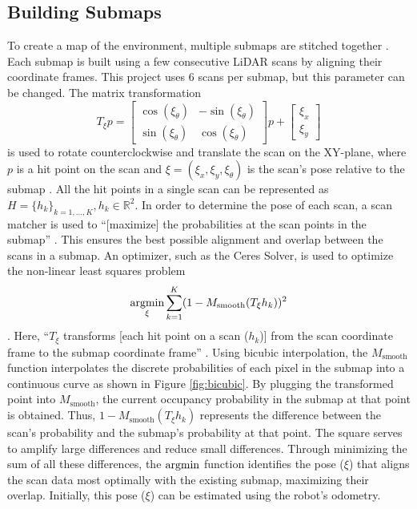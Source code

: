 \subsection{Building Submaps} \label{submaps}
To create a map of the environment, multiple submaps are stitched together \parencite{hessRealtimeLoopClosure2016}. Each submap is built using a few consecutive LiDAR scans by aligning their coordinate frames. This project uses 6 scans per submap, but this parameter can be changed. The matrix transformation
\[
    T_\xi p =
    \begin{bmatrix}
        \cos(\xi_\theta) & -\sin(\xi_\theta) \\
        \sin(\xi_\theta) & \cos(\xi_\theta)
    \end{bmatrix}p + \begin{bmatrix}
        \xi_x \\
        \xi_y
    \end{bmatrix}
\]
is used to rotate counterclockwise and translate the scan on the XY-plane, where $p$ is a hit point on the scan and $\xi=(\xi_x,\xi_y,\xi_\theta)$ is the scan's pose relative to the submap \parencite{RotationMatrix2024,hessRealtimeLoopClosure2016}. All the hit points in a single scan can be represented as $H=\{h_k\}_{k=1,\ldots,K},h_k\in\mathbb{R}^2$. In order to determine the pose of each scan, a scan matcher is used to ``[maximize] the probabilities at the scan points in the submap'' \parencite{hessRealtimeLoopClosure2016}. This ensures the best possible alignment and overlap between the scans in a submap. An optimizer, such as the Ceres Solver, is used to optimize the non-linear least squares problem
\[
    \operatorname*{argmin}_{\xi} \sum_{k=1}^{K}(1 - M_\text{smooth}(T_\xi h_k))^2
\]
\parencite{SolvingNonlinearLeast,hessRealtimeLoopClosure2016}. Here, ``$T_\xi$ transforms [each hit point on a scan ($h_k$)] from the scan coordinate frame to the submap coordinate frame'' \parencite{hessRealtimeLoopClosure2016}. Using bicubic interpolation, the $M_\text{smooth}$ function interpolates the discrete probabilities of each pixel in the submap into a continuous curve as shown in Figure \ref{fig:bicubic}. By plugging the transformed point into $M_\text{smooth}$, the current occupancy probability in the submap at that point is obtained. Thus, $1 - M_\text{smooth}(T_\xi h_k)$ represents the difference between the scan's probability and the submap's probability at that point. The square serves to amplify large differences and reduce small differences. Through minimizing the sum of all these differences, the $\operatorname*{argmin}$ function identifies the pose ($\xi$) that aligns the scan data most optimally with the existing submap, maximizing their overlap. Initially, this pose ($\xi$) can be estimated using the robot's odometry.

